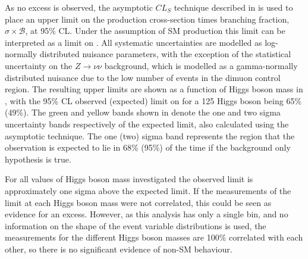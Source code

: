 As no excess is observed, the asymptotic $CL_{S}$ technique described in  is used to place an upper limit on the production cross-section times branching fraction, $\sigma\times\mathcal{B}$, at 95\% \ac{CL}. Under the assumption of \ac{SM} production this limit can be interpreted as a limit on \BRinv. All systematic uncertainties are modelled as log-normally distributed nuisance parameters, with the exception of the statistical uncertainty on the $Z\rightarrow\nu\nu$ background, which is modelled as a gamma-normally distributed nuisance due to the low number of events in the dimuon control region. The resulting upper limits are shown as a function of Higgs boson mass in , with the 95\% \ac{CL} observed (expected) limit on \BRinv for a 125 \GeV Higgs boson being 65\% (49\%). The green and yellow bands shown in  denote the one and two sigma uncertainty bands respectively of the expected limit, also calculated using the asymptotic technique. The one (two) sigma band represents the region that the observation is expected to lie in 68\% (95\%) of the time if the background only hypothesis is true.

For all values of Higgs boson mass investigated the observed limit is approximately one sigma above the expected limit. If the measurements of the limit at each Higgs boson mass were not correlated, this could be seen as evidence for an excess. However, as this analysis has only a single bin, and no information on the shape of the event variable distributions is used, the measurements for the different Higgs boson masses are 100\% correlated with each other, so there is no significant evidence of non-\ac{SM} behaviour.

